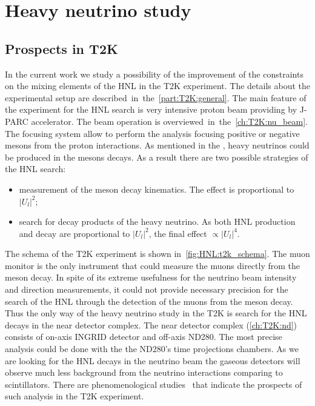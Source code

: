 \documentclass[../main.tex]{subfiles}
\begin{document}
\renewcommand{\labelitemi}{\ding{226}}
\renewcommand{\labelitemii}{\ding{227}}

\part{Heavy neutrino study}

\chapter{Prospects in T2K}


In the current work we study a possibility of the improvement of the constraints on the mixing elements of the HNL in the T2K experiment. The details about the experimental setup are described~in~the~\autoref{part:T2K:general}. The main feature of the experiment for the HNL search is very intensive proton beam providing by J-PARC accelerator. The beam operation is overviewed~in~the~\autoref{ch:T2K:nu_beam}. The focusing system allow to perform the analysis focusing positive or negative mesons from the proton interactions. As mentioned in the , heavy neutrinos could be produced in the mesons decays. As a result there are two possible strategies of the HNL search:
\begin{itemize}
    \item measurement of the meson decay kinematics. The effect is proportional to $\left|U_l\right|^2$;
    \item search for decay products of the heavy neutrino. As both HNL production and decay are proportional to $\left|U_l\right|^2$, the final effect $\propto\left|U_l\right|^4$.
\end{itemize}

The schema of the T2K experiment is shown in~\autoref{fig:HNL:t2k_schema}. The muon monitor is the only instrument that could measure the muons directly from the meson decay. In spite of its extreme usefulness for the neutrino beam intensity and direction measurements, it could not provide necessary precision for the search of the HNL through the detection of the muons from the meson decay. Thus the only way of the heavy neutrino study in the T2K is search for the HNL decays in the near detector complex. The near detector complex (\autoref{ch:T2K:nd}) consists of on-axis INGRID detector and off-axis ND280. The most precise analysis could be done with the the ND280's time projections chambers. As we are looking for the HNL decays in the neutrino beam the gaseous detectors will observe much less background from the neutrino interactions comparing to scintillators. There are phenomenological studies~\cite{Asaka2012} that indicate the prospects of such analysis in the T2K experiment.
\end{document}
